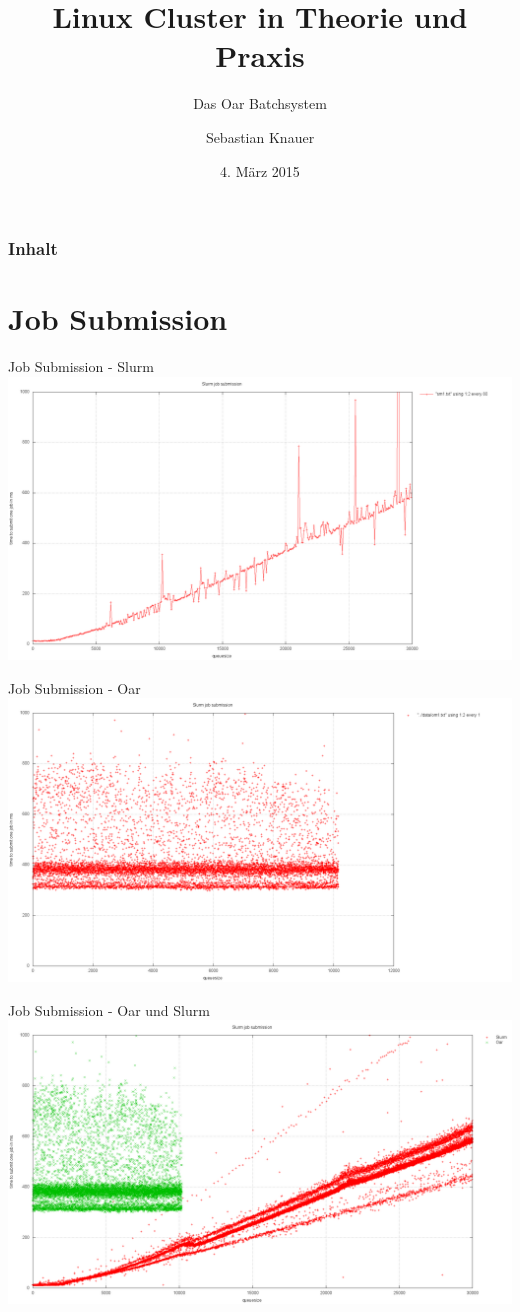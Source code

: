 \documentclass[10pt,utf8]{beamer}
\title{Linux Cluster in Theorie und Praxis}
\subtitle{Das Oar Batchsystem}
\author{Sebastian Knauer}
\date{4. M\"arz 2015}
\institute[ZIH TUD]{Zentrum f\"ur Informationsdienste und Hochleistungsrechnen -- TU Dresden}
\begin{document}
\zihmaketitle

\begin{frame}
\frametitle{Inhalt}
	\tableofcontents
\end{frame}

\section{Job Submission}
\begin{frame}{Job Submission - Slurm}
	\includegraphics[scale=0.22, keepaspectratio]{../output/pics/slurm.png}
\end{frame}

\begin{frame}{Job Submission - Oar}
	\includegraphics[scale=0.22, keepaspectratio]{../output/pics/oar.png}
\end{frame}

\begin{frame}{Job Submission - Oar und Slurm}
	\includegraphics[scale=0.22, keepaspectratio]{../output/pics/oar_slurm.png}
\end{frame}
\end{document}
